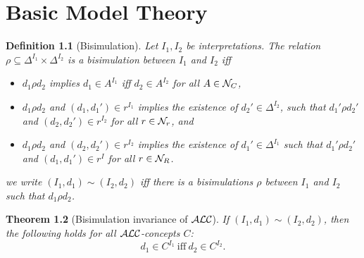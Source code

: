 \documentclass[openany]{scrbook}
\theoremstyle{break}
\newtheorem{Theorem}{Theorem}[chapter]
\newtheorem{Definition}[Theorem]{Definition}
\theoremstyle{nonumberbreak}
\theoremstyle{nonumberplain}
\theoremstyle{nonumberbreak}
\newcommand{\ALC}{{\cal A}{\cal L}{\cal C}}
\begin{document}
\chapter{Basic Model Theory}
\begin{Definition}[Bisimulation]
  \label{3.1}
  Let $I_1, I_2$ be interpretations.
  The relation $\rho \subseteq \Delta^{I_1} \times \Delta^{I_2}$ is a
  bisimulation between $I_1$ and $I_2$ iff
  \begin{itemize}
  \item $d_1 \rho d_2$ implies $d_1 \in A^{I_1}$ iff $d_2 \in A^{I_2}$
    for all $A \in {\cal N}_C$,
  \item $d_1 \rho d_2$ and $(d_1, d_1') \in r^{I_1}$ implies the
    existence of $d_2' \in \Delta^{I_2}$, such that $d_1' \rho d_2'$
    and $(d_2, d_2') \in r^{I_2}$ for all $r \in {\cal N}_r$, and
  \item $d_1 \rho d_2$ and $(d_2, d_2') \in r^{I_2}$ implies the
    existence of $d_1' \in \Delta^{I_1}$ such that $d_1' \rho d_2'$
    and $(d_1, d_1') \in r^I$ for all $r \in {\cal N}_R$.
  \end{itemize}

  we write $(I_1, d_1) \sim (I_2, d_2)$ iff there is a bisimulations
  $\rho$ between $I_1$ and $I_2$ such that $d_1 \rho d_2$.
\end{Definition}

\begin{Theorem}[Bisimulation invariance of $\ALC$]
  \label{3.2}
  If $(I_1, d_1) \sim (I_2, d_2)$, then the following holds for all
  $\ALC$-concepts $C$:
  \begin{equation*}
    d_1 \in C^{I_1}\ \text{iff}\ d_2 \in C^{I_2}.
  \end{equation*}
\end{Theorem}
\end{document}
